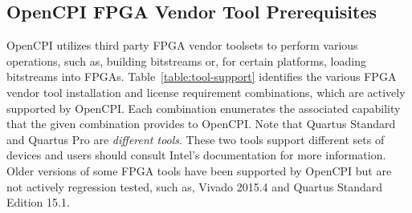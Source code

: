 \begin{flushleft}
\begin{landscape}
\section{OpenCPI FPGA Vendor Tool Prerequisites}
\label{sec:doc_overview}
OpenCPI utilizes third party FPGA vendor toolsets to perform various operations, such as, building bitstreams or, for certain platforms, loading  bitstreams into FPGAs. Table~\ref{table:tool-support} identifies the various FPGA vendor tool installation and license requirement combinations, which are actively supported by OpenCPI. Each combination enumerates the associated capability that the given combination provides to OpenCPI. Note that Quartus Standard and Quartus Pro are \textit{different tools}. These two tools support different sets of devices and users should consult Intel's documentation for more information. Older versions of some FPGA tools have been supported by OpenCPI but are not actively regression tested, such as, Vivado 2015.4 and Quartus Standard Edition 15.1. \\


\end{landscape}
\end{flushleft}
